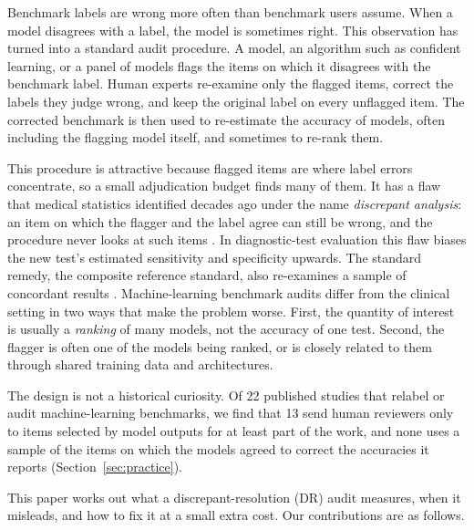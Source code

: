 \documentclass[twoside,11pt]{article}
\newcommand{\1}{\mathbf{1}}
\begin{document}
Benchmark labels are wrong more often than benchmark users assume. When a model disagrees with a label, the model is sometimes right. This observation has turned into a standard audit procedure. A model, an algorithm such as confident learning, or a panel of models flags the items on which it disagrees with the benchmark label. Human experts re-examine only the flagged items, correct the labels they judge wrong, and keep the original label on every unflagged item. The corrected benchmark is then used to re-estimate the accuracy of models, often including the flagging model itself, and sometimes to re-rank them.

This procedure is attractive because flagged items are where label errors concentrate, so a small adjudication budget finds many of them. It has a flaw that medical statistics identified decades ago under the name \emph{discrepant analysis}: an item on which the flagger and the label agree can still be wrong, and the procedure never looks at such items \citep{hadgu1996discrepancy,miller1998bias}. In diagnostic-test evaluation this flaw biases the new test's estimated sensitivity and specificity upwards. The standard remedy, the composite reference standard, also re-examines a sample of concordant results \citep{alonzo1999using}. Machine-learning benchmark audits differ from the clinical setting in two ways that make the problem worse. First, the quantity of interest is usually a \emph{ranking} of many models, not the accuracy of one test. Second, the flagger is often one of the models being ranked, or is closely related to them through shared training data and architectures.

The design is not a historical curiosity. Of 22 published studies that relabel or audit machine-learning benchmarks, we find that 13 send human reviewers only to items selected by model outputs for at least part of the work, and none uses a sample of the items on which the models agreed to correct the accuracies it reports (Section~\ref{sec:practice}).

This paper works out what a discrepant-resolution (DR) audit measures, when it misleads, and how to fix it at a small extra cost. Our contributions are as follows.
\end{document}
